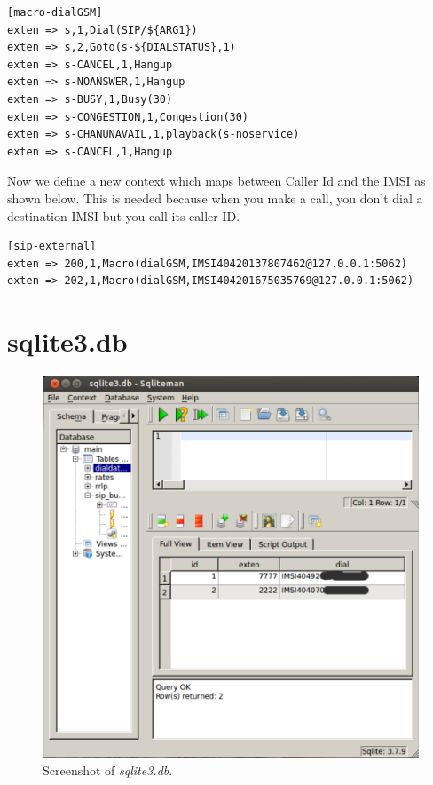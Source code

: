 \begin{verbatim}
[macro-dialGSM]
exten => s,1,Dial(SIP/${ARG1})
exten => s,2,Goto(s-${DIALSTATUS},1)
exten => s-CANCEL,1,Hangup
exten => s-NOANSWER,1,Hangup
exten => s-BUSY,1,Busy(30)
exten => s-CONGESTION,1,Congestion(30)
exten => s-CHANUNAVAIL,1,playback(s-noservice)
exten => s-CANCEL,1,Hangup
\end{verbatim}

Now we define a new context which maps between Caller Id and the IMSI as shown
below. This is needed because when you make a call, you don't dial a
destination IMSI but you call its caller ID.

\begin{verbatim}
[sip-external]
exten => 200,1,Macro(dialGSM,IMSI40420137807462@127.0.0.1:5062)
exten => 202,1,Macro(dialGSM,IMSI404201675035769@127.0.0.1:5062)
\end{verbatim}


\section{sqlite3.db}

\begin{figure}
  \centering
    \includegraphics[width=\textwidth]{../images/dialdata}
  \caption[Screenshot - sqlite3.db]{Screenshot of \emph{sqlite3.db}.}
  \label{dialdata}
\end{figure}

